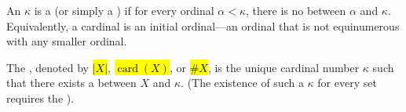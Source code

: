 \begin{definition} \label{definition:cardinal_number_and_cardinality_of_a_set}
An  $\kappa$ is a  (or simply a ) if for every ordinal $\alpha < \kappa$, there is no  between $\alpha$ and $\kappa$. Equivalently, a cardinal is an initial ordinal—an ordinal that is not equinumerous with any smaller ordinal.

The , denoted by \hl{$|X|$}, \hl{$\operatorname{card}(X)$}, or \hl{$\# X$}, is the unique cardinal number $\kappa$ such that there exists a  between $X$ and $\kappa$. (The existence of such a $\kappa$ for every set requires the ).
\end{definition}